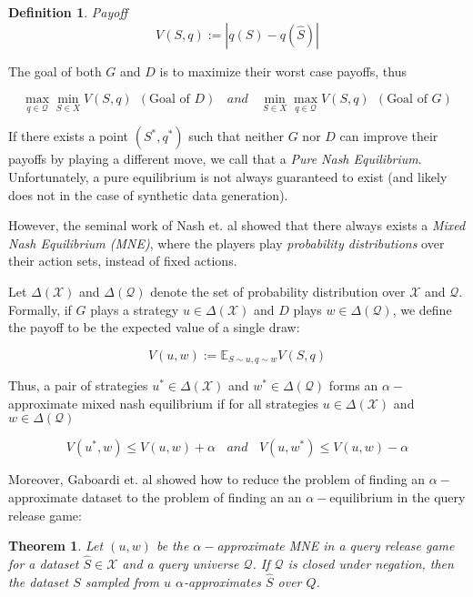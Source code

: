 \documentclass[]{article}
\newcommand{\X}{\mathcal{X}}
\newcommand{\Q}{\mathcal{Q}}
\newtheorem{definition}{Definition}
\newtheorem{theorem}{Theorem}
\begin{document}
\begin{definition}{Payoff}
    \begin{equation}
        V(S,q) := |q(S) - q(\hat S)|
    \end{equation}
\end{definition}

The goal of both $G$ and $D$ is to maximize their worst case payoffs, thus

\begin{equation}
    \max_{q \in \Q} \min_{S \in X} V(S,q) ~~ (\text{Goal of } D) ~~~~ and ~~~~ 
    \min_{S \in X} \max_{q \in \Q} V(S,q) ~~ (\text{Goal of } G) 
\end{equation}

If there exists a point $(S^*, q^*)$ such that neither $G$ nor $D$ can improve their payoffs by playing a different move, we call that a \emph{Pure Nash Equilibrium}. Unfortunately, a pure equilibrium is not always guaranteed to exist (and likely does not in the case of synthetic data generation). 

However, the seminal work of Nash et. al showed that there always exists a \emph{Mixed Nash Equilibrium (MNE)}, where the players play \emph{probability distributions} over their action sets, instead of fixed actions. 

Let $\Delta(\X)$ and $\Delta(\Q)$ denote the set of probability distribution over $\X$ and $\Q$. Formally, if $G$ plays a strategy $u \in \Delta(\X)$ and $D$ plays  $w \in \Delta(\Q)$, we define the payoff to be the expected value of a single draw:

\begin{equation}
    V(u,w) := \mathbb{E}_{S \sim u, q \sim w} V(S,q)
\end{equation}

Thus, a pair of strategies $u^* \in \Delta(\X)$ and $w^* \in \Delta(\Q)$ forms an $\alpha-$approximate mixed nash equilibrium if for all strategies $u \in \Delta(\X)$ and $w \in \Delta(\Q)$

\begin{equation}
    V(u^*, w) \leq V(u,w) + \alpha ~~~~ and ~~~~ V(u, w^*) \leq V(u,w) - \alpha 
\end{equation}

Moreover, Gaboardi et. al showed how to reduce the problem of finding an $\alpha-$approximate dataset to the problem of finding an an $\alpha-$equilibrium in the query release game:

\begin{theorem}
    Let $(u,w)$ be the $\alpha-$approximate MNE in a query release game for a dataset $\hat S \in \X$ and a query universe $\Q$. If $\Q$ is closed under negation, then the dataset $S$ sampled from $u$ $\alpha$-approximates $\hat S$ over $Q$. \cite{GAH+14}
\end{theorem}
\end{document}
